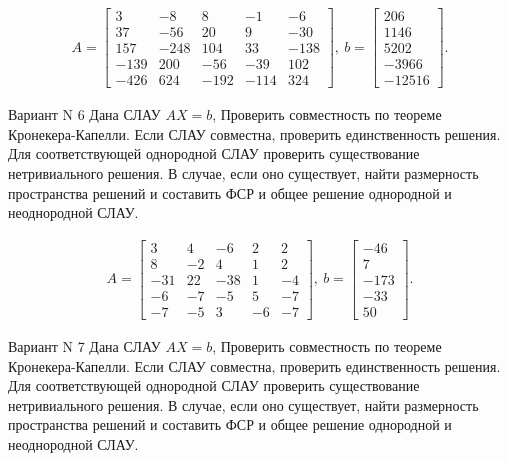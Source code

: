 \documentclass[11pt]{report}
\begin{document}
\begin{align*}
 A = \left[\begin{matrix}3 & -8 & 8 & -1 & -6\\37 & -56 & 20 & 9 & -30\\157 & -248 & 104 & 33 & -138\\-139 & 200 & -56 & -39 & 102\\-426 & 624 & -192 & -114 & 324\end{matrix}\right],
\ b = \left[\begin{matrix}206\\1146\\5202\\-3966\\-12516\end{matrix}\right]. 
 \end{align*}

Вариант N 6
Дана СЛАУ $AX = b$,
Проверить совместность по теореме Кронекера-Капелли. Если СЛАУ совместна, проверить единственность решения.
Для соответствующей однородной СЛАУ проверить существование нетривиального решения. В случае, если оно существует,
найти размерность пространства решений и составить ФСР и общее решение однородной  и неоднородной СЛАУ.


\begin{align*}
 A = \left[\begin{matrix}3 & 4 & -6 & 2 & 2\\8 & -2 & 4 & 1 & 2\\-31 & 22 & -38 & 1 & -4\\-6 & -7 & -5 & 5 & -7\\-7 & -5 & 3 & -6 & -7\end{matrix}\right],
\ b = \left[\begin{matrix}-46\\7\\-173\\-33\\50\end{matrix}\right]. 
 \end{align*}

Вариант N 7
Дана СЛАУ $AX = b$,
Проверить совместность по теореме Кронекера-Капелли. Если СЛАУ совместна, проверить единственность решения.
Для соответствующей однородной СЛАУ проверить существование нетривиального решения. В случае, если оно существует,
найти размерность пространства решений и составить ФСР и общее решение однородной  и неоднородной СЛАУ.
\end{document}
